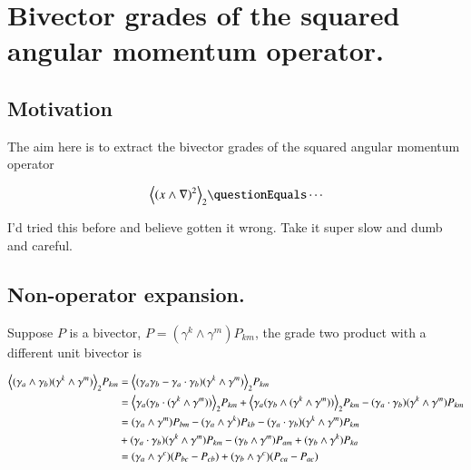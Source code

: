 %

\chapter{Bivector grades of the squared angular momentum operator.}
\label{chap:bivectorSelect}
{}
\date{Sept 6, 2009}

\beginArtNoToc

\section{Motivation}

The aim here is to extract the bivector grades of the squared angular momentum operator

\begin{align}\label{eqn:bivectorSelect:goo1}
\gpgradetwo{ (x \wedge \grad)^2 } \questionEquals \cdots
\end{align}

I'd tried this before and believe gotten it wrong.  Take it super slow and dumb and careful.

\section{Non-operator expansion.}

Suppose $P$ is a bivector, $P = (\gamma^k \wedge \gamma^m) P_{km}$, the grade two product with a different unit bivector is

\begin{align*}
{\left\langle{{ (\gamma_a \wedge \gamma_b) (\gamma^k \wedge \gamma^m) }}\right\rangle}_{2} P_{km} 
&= 
{\left\langle{{ (\gamma_a \gamma_b - \gamma_a \cdot \gamma_b) (\gamma^k \wedge \gamma^m) }}\right\rangle}_{2} P_{km} \\
&= 
{\left\langle{{ \gamma_a (\gamma_b \cdot (\gamma^k \wedge \gamma^m)) }}\right\rangle}_{2} P_{km} 
+ {\left\langle{{ \gamma_a (\gamma_b \wedge (\gamma^k \wedge \gamma^m)) }}\right\rangle}_{2} P_{km} 
- (\gamma_a \cdot \gamma_b) (\gamma^k \wedge \gamma^m) P_{km} \\
&= 
(\gamma_a \wedge \gamma^m) P_{b m} -(\gamma_a \wedge \gamma^k) P_{k b} - (\gamma_a \cdot \gamma_b) (\gamma^k \wedge \gamma^m) P_{km} \\
&+ (\gamma_a \cdot \gamma_b) (\gamma^k \wedge \gamma^m) P_{km} 
- (\gamma_b \wedge \gamma^m) P_{a m} 
+ (\gamma_b \wedge \gamma^k) P_{k a} 
\\
&= 
(\gamma_a \wedge \gamma^c) (P_{b c} -P_{c b})
+ (\gamma_b \wedge \gamma^c) (P_{c a} -P_{a c} )
\\
\end{align*}

